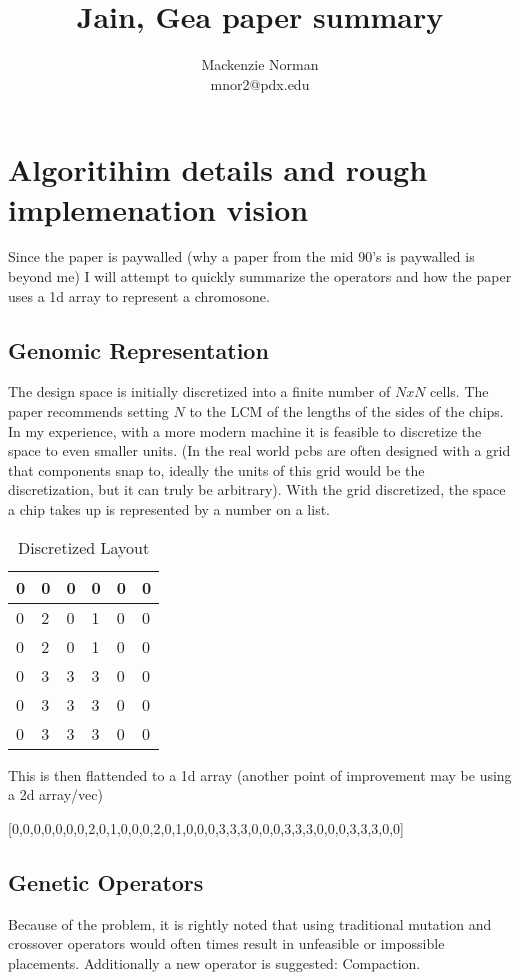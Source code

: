 \documentclass{article}
\title{Jain, Gea paper summary}
\author{Mackenzie Norman\\ mnor2@pdx.edu}
\begin{document}
\maketitle

\section{Algoritihim details and rough implemenation vision}
Since the paper is paywalled (why a paper from the mid 90's is paywalled is beyond me) I will attempt to quickly summarize the operators and how the paper uses a 1d array to represent a chromosone. 

\subsection{Genomic Representation}
The design space is initially discretized into a finite number of $ N x N $ cells. The paper recommends setting $N$ to the LCM of the lengths of the sides of the chips. In my experience, with a more modern machine it is feasible to discretize the space to even smaller units. (In the real world pcbs are often designed with a grid that components snap to, ideally the units of this grid would be the discretization, but it can truly be arbitrary). With the grid discretized, the space a chip takes up is represented by a number on a list. 

\begin{table}[ht]
    \centering
\begin{tabular}{|l|l|l|l|l|l|}
\hline
0 & 0 & 0 & 0 & 0 & 0 \\ \hline
0 & 2 & 0 & 1 & 0 & 0 \\ \hline
0 & 2 & 0 & 1 & 0 & 0 \\ \hline
0 & 3 & 3 & 3 & 0 & 0 \\ \hline
0 & 3 & 3 & 3 & 0 & 0 \\ \hline
0 & 3 & 3 & 3 & 0 & 0 \\ \hline
\end{tabular}

\caption{Discretized Layout}
\end{table}

This is then flattended to a 1d array (another point of improvement may be using a 2d array/vec)

[0,0,0,0,0,0,0,2,0,1,0,0,0,2,0,1,0,0,0,3,3,3,0,0,0,3,3,3,0,0,0,3,3,3,0,0]

\subsection{Genetic Operators}
Because of the problem, it is rightly noted that using traditional mutation and crossover operators would often times result in unfeasible or impossible placements. Additionally a new operator is suggested: Compaction. 
\end{document}
